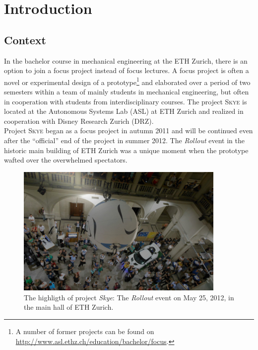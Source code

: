 \chapter{Introduction}\label{sec:introduction}
\graphicspath{{graphics/}{graphics/systems/}}


\section{Context}
\label{sec:context}

In the bachelor course in mechanical engineering at the ETH Zurich, there is an option to join a focus project instead of focus lectures. A focus project is often a novel or experimental design of a prototype\footnote{A number of former projects can be found on \url{http://www.asl.ethz.ch/education/bachelor/focus}.} and elaborated over a period of two semesters within a team of mainly students in mechanical engineering, but often in cooperation with students from interdisciplinary courses. The project \textsc{Skye} is located at the Autonomous Systems Lab (ASL) at ETH Zurich and realized in cooperation with Disney Research Zurich (DRZ). \\
Project \textsc{Skye} began as a focus project in autumn \num{2011} and will be continued even after the ``official'' end of the project in summer 2012. The \textit{Rollout} event in the historic main building of ETH Zurich was a unique moment when the prototype wafted over the overwhelmed spectators. \\

\begin{figure}[H]
	\centering
    \includegraphics[width = 0.9\textwidth]{graphics/rollout2.jpg}
  \caption{The highligth of project \textit{Skye}: The \textit{Rollout} event on May 25, 2012, in the main hall of ETH Zurich.}
  \label{fig:rollout}
\end{figure}


